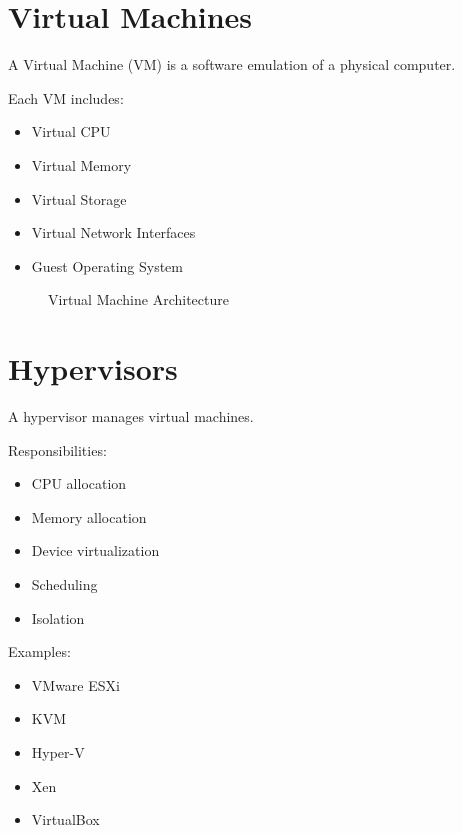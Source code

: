 \section{Virtual Machines}

A Virtual Machine (VM) is a software emulation of a physical computer.

Each VM includes:

\begin{itemize}
\item Virtual CPU
\item Virtual Memory
\item Virtual Storage
\item Virtual Network Interfaces
\item Guest Operating System
\end{itemize}

\begin{figure}[H]
\centering
{}
\caption{Virtual Machine Architecture}
\end{figure}

\section{Hypervisors}

A hypervisor manages virtual machines.

Responsibilities:

\begin{itemize}
\item CPU allocation
\item Memory allocation
\item Device virtualization
\item Scheduling
\item Isolation
\end{itemize}

Examples:

\begin{itemize}
\item VMware ESXi
\item KVM
\item Hyper-V
\item Xen
\item VirtualBox
\end{itemize}

